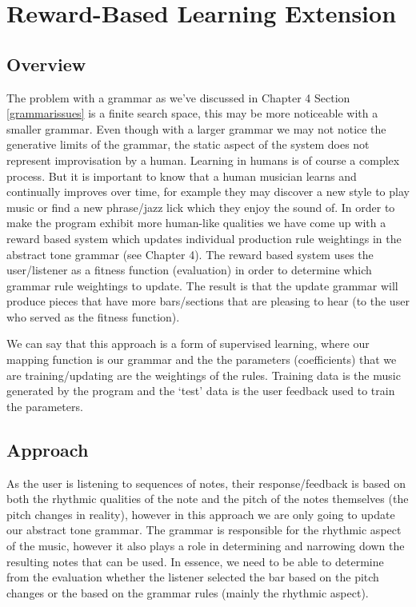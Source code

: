 \documentclass[pdftex,12pt,a4paper]{report}
\begin{document}
\chapter{Reward-Based Learning Extension}

\section{Overview}
The problem with a grammar as we've discussed in Chapter 4 Section \ref{grammarissues} is a finite search space, this may be more noticeable with a smaller grammar. Even though with a larger grammar we may not notice the generative limits of the grammar, the static aspect of the system does not represent improvisation by a human. Learning in humans is of course a complex process. But it is important to know that a human musician learns and continually improves over time, for example they may discover a new style to play music or find a new phrase/jazz lick which they enjoy the sound of. In order to make the program exhibit more human-like qualities we have come up with a reward based system which updates individual production rule weightings in the abstract tone grammar (see Chapter 4). The reward based system uses the user/listener as a fitness function (evaluation) in order to determine which grammar rule weightings to update. The result is that the update grammar will produce pieces that have more bars/sections that are pleasing to hear (to the user who served as the fitness function).

We can say that this approach is a form of supervised learning, where our mapping function is our grammar and the the parameters (coefficients) that we are training/updating are the weightings of the rules. Training data is the music generated by the program and the `test' data is the user feedback used to train the parameters.

\section{Approach}
As the user is listening to sequences of notes, their response/feedback is based on both the rhythmic qualities of the note and the pitch of the notes themselves (the pitch changes in reality), however in this approach we are only going to update our abstract tone grammar. The grammar is responsible for the rhythmic aspect of the music, however it also plays a role in determining and narrowing down the resulting notes that can be used. In essence, we need to be able to determine from the evaluation whether the listener selected the bar based on the pitch changes or the based on the grammar rules (mainly the rhythmic aspect). 
\end{document}
